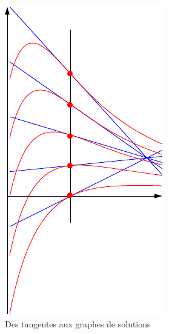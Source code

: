 \begin{figure}[!ht]
 \centering
 \includegraphics{Eeqd7_1.pdf}
 \caption{Des tangentes aux graphes de solutions}
 \label{fig:Eeqd7_1}
\end{figure}

